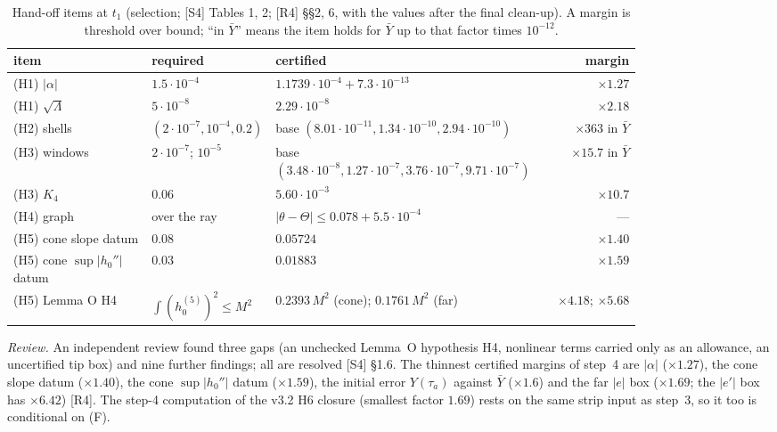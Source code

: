 \documentclass[11pt]{amsart}
\theoremstyle{definition}
\theoremstyle{remark}
\newcommand{\Lam}{\Lambda}
\newcommand{\dref}[1]{[\textsf{#1}]}
\begin{document}
\begin{table}[htbp]\centering\small
\caption{Hand-off items at $t_1$ (selection; \dref{S4} Tables 1, 2; \dref{R4} \S\S2, 6, with the values after the final clean-up). A margin is threshold over bound; ``in $\bar Y$'' means the item holds for $\bar Y$ up to that factor times $10^{-12}$.}\label{tab:handoff}
\footnotesize
\begin{tabular}{@{}p{0.22\linewidth}p{0.19\linewidth}p{0.41\linewidth}r@{}}\toprule
item & required & certified & margin\\\midrule
(H1) $|\alpha|$ & $1.5\cdot10^{-4}$ & $1.1739\cdot10^{-4}+7.3\cdot10^{-13}$ & $\times1.27$\\
(H1) $\sqrt\Lam$ & $5\cdot10^{-8}$ & $2.29\cdot10^{-8}$ & $\times2.18$\\
(H2) shells & $(2\cdot10^{-7},10^{-4},0.2)$ & base $(8.01\cdot10^{-11},1.34\cdot10^{-10},2.94\cdot10^{-10})$ & $\times363$ in $\bar Y$\\
(H3) windows & $2\cdot10^{-7}$; $10^{-5}$ & base $(3.48\cdot10^{-8},1.27\cdot10^{-7},3.76\cdot10^{-7},9.71\cdot10^{-7})$ & $\times15.7$ in $\bar Y$\\
(H3) $K_4$ & $0.06$ & $5.60\cdot10^{-3}$ & $\times10.7$\\
(H4) graph & over the ray & $|\theta-\Theta|\le0.078+5.5\cdot10^{-4}$ & ---\\
(H5) cone slope datum & $0.08$ & $0.05724$ & $\times1.40$\\
(H5) cone $\sup|h_0''|$ datum & $0.03$ & $0.01883$ & $\times1.59$\\
(H5) Lemma O H4 & $\int(h_0^{(5)})^2\le M^2$ & $0.2393\,M^2$ (cone); $0.1761\,M^2$ (far) & $\times4.18$; $\times5.68$\\\bottomrule
\end{tabular}\end{table}

\emph{Review.} An independent review found three gaps (an unchecked Lemma~O hypothesis H4, nonlinear terms carried only as an allowance, an uncertified tip box) and nine further findings; all are resolved \dref{S4} \S1.6. The thinnest certified margins of step~4 are $|\alpha|$ ($\times1.27$), the cone slope datum ($\times1.40$), the cone $\sup|h_0''|$ datum ($\times1.59$), the initial error $Y(\tau_a)$ against $\bar Y$ ($\times1.6$) and the far $|e|$ box ($\times1.69$; the $|e'|$ box has $\times6.42$) \dref{R4}. The step-4 computation of the v3.2 H6 closure (smallest factor $1.69$) rests on the same strip input as step~3, so it too is conditional on (F).
\end{document}

